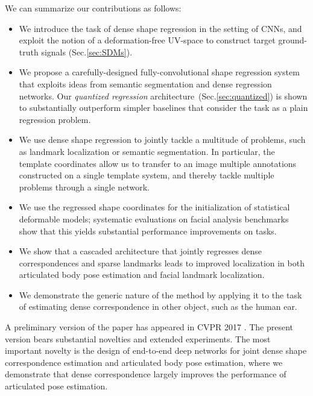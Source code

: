 We can summarize our contributions as follows:
\begin{itemize}
\item We introduce the task of dense shape regression in the setting of CNNs, and exploit the notion of a deformation-free UV-space to construct target ground-truth signals (Sec.\ref{sec:SDMs}).
\item We propose a carefully-designed fully-convolutional shape regression system that exploits ideas from semantic segmentation and dense regression networks. Our \textit{quantized regression} architecture~(Sec.\ref{sec:quantized}) is shown to substantially outperform simpler baselines that consider the task as a plain regression problem. 
\item We use dense shape regression to jointly tackle a multitude of problems, such as landmark localization or semantic segmentation.
In particular, the template coordinates allow us to transfer to an image multiple annotations constructed on a single template system, and thereby tackle multiple problems through a single network.
\item We use the regressed shape coordinates for the initialization of statistical deformable models; systematic evaluations on facial analysis benchmarks show that this yields substantial performance improvements  on tasks.
\item We  show that a cascaded architecture that jointly regresses dense correspondences and sparse landmarks leads to improved localization in both articulated body pose estimation and facial landmark localization. 
\item We  demonstrate the generic nature of the method by applying it to the task of estimating dense correspondence in other object, such as the human ear.
\end{itemize}
A preliminary version of the paper has appeared in CVPR 2017 \citep{guler2016densereg}. The present version bears substantial novelties and extended experiments. The most important novelty is the design of end-to-end deep networks for joint dense shape correspondence estimation and articulated body pose estimation, where we demonstrate that dense correspondence largely improves the performance of articulated pose estimation.
 

